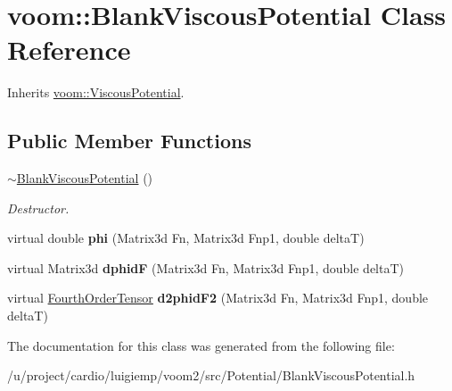 \hypertarget{classvoom_1_1_blank_viscous_potential}{
\section{voom::BlankViscousPotential Class Reference}
\label{classvoom_1_1_blank_viscous_potential}
}


Inherits \hyperlink{classvoom_1_1_viscous_potential}{voom::ViscousPotential}.\subsection*{Public Member Functions}
\begin{DoxyCompactItemize}
\item 
\hypertarget{classvoom_1_1_blank_viscous_potential_a8898732d6e5c6e618ccb0047b7729f7d}{
\hyperlink{classvoom_1_1_blank_viscous_potential_a8898732d6e5c6e618ccb0047b7729f7d}{$\sim$BlankViscousPotential} ()}
\label{classvoom_1_1_blank_viscous_potential_a8898732d6e5c6e618ccb0047b7729f7d}

\begin{DoxyCompactList}\small\item\em Destructor. \item\end{DoxyCompactList}\item 
\hypertarget{classvoom_1_1_blank_viscous_potential_a9bca7b1accef7e70851ef7a12bc36dba}{
virtual double {\bfseries phi} (Matrix3d Fn, Matrix3d Fnp1, double deltaT)}
\label{classvoom_1_1_blank_viscous_potential_a9bca7b1accef7e70851ef7a12bc36dba}

\item 
\hypertarget{classvoom_1_1_blank_viscous_potential_a7c3fc6ef7592c64ca6b1822a07ecbe86}{
virtual Matrix3d {\bfseries dphidF} (Matrix3d Fn, Matrix3d Fnp1, double deltaT)}
\label{classvoom_1_1_blank_viscous_potential_a7c3fc6ef7592c64ca6b1822a07ecbe86}

\item 
\hypertarget{classvoom_1_1_blank_viscous_potential_af4979894429f641f6e98f73590c87768}{
virtual \hyperlink{classvoom_1_1_fourth_order_tensor}{FourthOrderTensor} {\bfseries d2phidF2} (Matrix3d Fn, Matrix3d Fnp1, double deltaT)}
\label{classvoom_1_1_blank_viscous_potential_af4979894429f641f6e98f73590c87768}

\end{DoxyCompactItemize}


The documentation for this class was generated from the following file:\begin{DoxyCompactItemize}
\item 
/u/project/cardio/luigiemp/voom2/src/Potential/BlankViscousPotential.h\end{DoxyCompactItemize}
